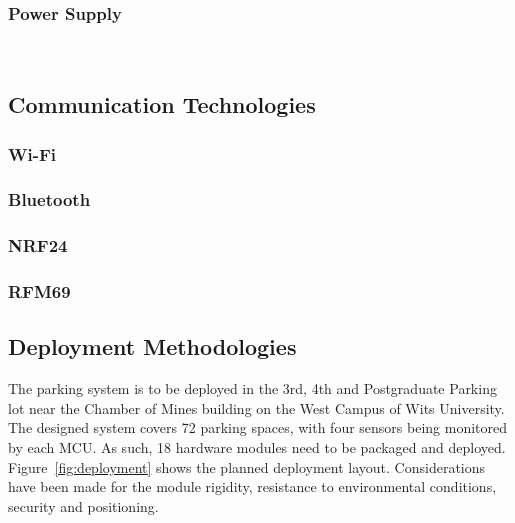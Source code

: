 \documentclass[10pt,twocolumn]{witseiepaper}
\begin{document}
		\subsubsection{Power Supply} $   $
	
	\subsection{Communication Technologies}
		\subsubsection{Wi-Fi}
		\subsubsection{Bluetooth}
		\subsubsection{NRF24}
		\subsubsection{RFM69}
	
	\subsection{Deployment Methodologies}
		The parking system is to be deployed in the 3rd, 4th and Postgraduate Parking lot near the Chamber of Mines building on the West Campus of Wits University. The designed system covers 72 parking spaces, with four sensors being monitored by each MCU. As such, 18 hardware modules need to be packaged and deployed. Figure~\ref{fig:deployment} shows the planned deployment layout. Considerations have been made for the module rigidity, resistance to environmental conditions, security and positioning.
		
\end{document}
